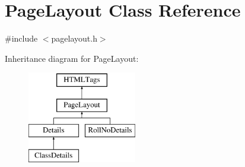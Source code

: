 \hypertarget{classPageLayout}{\section{Page\-Layout Class Reference}
\label{classPageLayout}
}


{\ttfamily \#include $<$pagelayout.\-h$>$}

Inheritance diagram for Page\-Layout\-:\begin{figure}[H]
\begin{center}
\leavevmode
\includegraphics[height=4.000000cm]{classPageLayout}
\end{center}
\end{figure}
